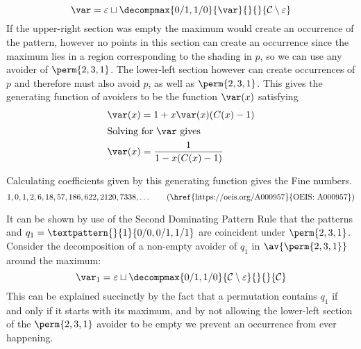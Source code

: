 \begin{equation*}
    \scriptvar = \varepsilon \sqcup
\decompmax{0/1,1/0}{\scriptvar}{}{}{\mathcal{C}\setminus\varepsilon}
\end{equation*}
If the upper-right section was empty the maximum would create an
occurrence of the pattern, however no points in this section can create
an occurrence since the maximum lies in a region corresponding to the
shading in \(p\), so we can use any avoider of \(\perm{2,3,1}\). The lower-left
section however can create occurrences
of \(p\) and therefore must also avoid \(p\), as well as \(\perm{2,3,1}\).
This gives the generating function of avoiders to be the function \(\var(x)\)
satisfying
\begin{align*}
    \var(x) &= 1 + x\var(x)(C(x)-1) \\
    \shortintertext{Solving for \(\var\) gives}
    \var(x) &= \frac{1}{1-x(C(x)-1)}
\end{align*}

\noindent
Calculating coefficients given by this generating function gives the Fine
numbers.
\begin{equation*}
    1, 0, 1, 2, 6, 18, 57, 186, 622, 2120, 7338,\dotsc
\tag{\href{https://oeis.org/A000957}{OEIS: A000957}}
\end{equation*}

\nextvar[\varfine]
It can be shown by use of the Second Dominating Pattern Rule that the patterns
 and \(q_1 = \textpattern{}{1}{0/0,0/1,1/1}\) are
coincident under \(\perm{2,3,1}\). Consider the decomposition of a non-empty
avoider of \(q_1\) in \(\av{\perm{2,3,1}}\) around the maximum:
\begin{equation*}
    \scriptvar_1 =\varepsilon \sqcup
\decompmax{0/1,1/0}{\mathcal{C}\setminus\varepsilon}{}{}{\mathcal{C}}
\end{equation*}
This can be explained succinctly by the fact that a permutation contains
\(q_1\) if and only if it starts with its maximum, and by not allowing the
lower-left section of the
\(\perm{2,3,1}\) avoider to be empty we prevent an occurrence from ever
happening.

